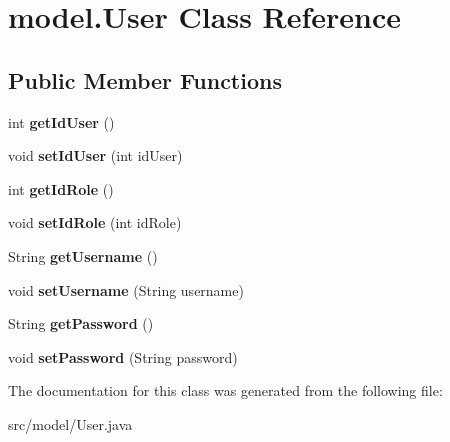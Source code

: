 \hypertarget{classmodel_1_1_user}{}\section{model.\+User Class Reference}
\label{classmodel_1_1_user}
\subsection*{Public Member Functions}
\begin{DoxyCompactItemize}
\item 
\mbox{\label{classmodel_1_1_user_a5642dc59bf50c2e56fe30e211f319225}} 
int {\bfseries get\+Id\+User} ()
\item 
\mbox{\label{classmodel_1_1_user_ad26c32d90f961bee59eee14631f33b3e}} 
void {\bfseries set\+Id\+User} (int id\+User)
\item 
\mbox{\label{classmodel_1_1_user_ad5f5af7e36e8b80d2995b3ac0c226702}} 
int {\bfseries get\+Id\+Role} ()
\item 
\mbox{\label{classmodel_1_1_user_a170d0fb35bcbf315c50fd5d424c7d989}} 
void {\bfseries set\+Id\+Role} (int id\+Role)
\item 
\mbox{\label{classmodel_1_1_user_a964ba13bb99d3bd7ab7c342a9c03bc46}} 
String {\bfseries get\+Username} ()
\item 
\mbox{\label{classmodel_1_1_user_ac6fc6dcee34eafcdb9a3d05569917bbf}} 
void {\bfseries set\+Username} (String username)
\item 
\mbox{\label{classmodel_1_1_user_ac50d8bd1c6b55d5793e22828055d5357}} 
String {\bfseries get\+Password} ()
\item 
\mbox{\label{classmodel_1_1_user_aea6892aee94929a724acea844061fa70}} 
void {\bfseries set\+Password} (String password)
\end{DoxyCompactItemize}


The documentation for this class was generated from the following file\+:\begin{DoxyCompactItemize}
\item 
src/model/User.\+java\end{DoxyCompactItemize}
